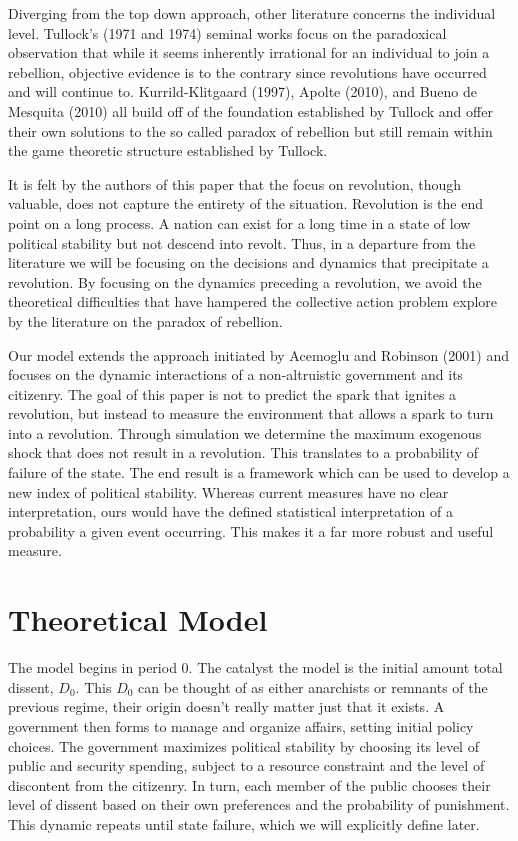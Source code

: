 \documentclass[12pt]{article}
\begin{document}
\begin{spacing}{1.5}
Diverging from the top down approach, other literature concerns the individual level. Tullock's (1971 and 1974) seminal works focus on the paradoxical observation that while it seems inherently irrational for an individual to join a rebellion, objective evidence is to the contrary since revolutions have occurred and will continue to. Kurrild-Klitgaard (1997), Apolte (2010), and Bueno de Mesquita (2010) all build off of the foundation established by Tullock and offer their own solutions to the so called paradox of rebellion but still remain within the game theoretic structure established by Tullock. 

It is felt by the authors of this paper that the focus on revolution, though valuable, does not capture the entirety of the situation. Revolution is the end point on a long process. A nation can exist for a long time in a state of low political stability but not descend into revolt. Thus, in a departure from the literature we will be focusing on the decisions and dynamics that precipitate a revolution. By focusing on the dynamics preceding a revolution, we avoid the theoretical difficulties that have hampered the collective action problem explore by the literature on the paradox of rebellion.  


Our model extends the approach initiated by Acemoglu and Robinson (2001) and focuses on the dynamic interactions of a non-altruistic government and its citizenry. The goal of this paper is not to predict the spark that ignites a revolution, but instead to measure the environment that allows a spark to turn into a revolution. Through simulation we determine the maximum exogenous shock that does not result in a revolution. This translates to a probability of failure of the state. The end result is a framework which can be used to develop a new index of political stability. Whereas current measures have no clear interpretation, ours would have the defined statistical interpretation of a probability a given event occurring. This makes it a far more robust and useful measure.    

\section{Theoretical Model}

The model begins in period 0. The catalyst the model is the initial amount total dissent, $D_0$. This $D_0$ can be thought of as either anarchists or remnants of the previous regime, their origin doesn't really matter just that it exists. A government then forms to manage and organize affairs, setting initial policy choices. The government maximizes political stability by choosing its level of public and security spending, subject to a resource constraint and the level of discontent from the citizenry. In turn, each member of the public chooses their level of dissent based on their own preferences and the probability of punishment. This dynamic repeats until state failure, which we will explicitly define later. 
 

\end{spacing}
\end{document}
